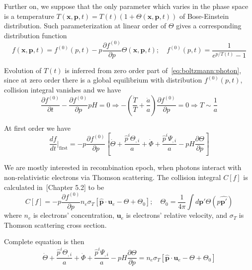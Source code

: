 \documentclass[12pt]{extarticle}
\numberwithin{problem}{section}
\numberwithin{theorem}{section}
\begin{document}
	Further on, we suppose that the only parameter which varies in the phase space is a temperature $T(\mathbf{x}, \mathbf{p}, t) = T(t)(1 + \Theta(\mathbf{x}, \mathbf{p}, t))$ of Bose-Einstein distribution. Such parameterization at linear order of $\Theta$ gives a corresponding distribution function
	\begin{equation}
		f(\mathbf{x}, \mathbf{p}, t) = f^{(0)}(p, t) - p\frac{\partial f^{(0)}}{\partial p}\Theta(\mathbf{x}, \mathbf{p}, t);\quad f^{(0)}(p, t) = \frac{1}{e^{p / T(t)} - 1}
	\end{equation} 

	Evolution of $T(t)$ is inferred from zero order part of~\ref{eq:boltzmann:photon}, since at zero order there is a global equilibrium with distribution $f^{(0)}(p, t)$, collision integral vanishes and we have
	\begin{equation}
		\frac{\partial f^{(0)}}{\partial t} - \frac{\partial f^{(0)}}{\partial p}pH = 0\Rightarrow -\left(\frac{\dot{T}}{T} + \frac{\dot{a}}{a}\right)\frac{\partial f^{(0)}}{\partial p} = 0\Rightarrow T\sim\frac{1}{a}
	\end{equation}

	At first order we have
	\begin{equation}
		\frac{df}{dt}\Big\lvert_{\text{first}} = -p\frac{\partial f^{(0)}}{\partial p}\left[\dot{\Theta} + \frac{\hat{p}^i\Theta_{,i}}{a} + \dot{\Phi} + \frac{\hat{p}^i\Psi_{,i}}{a} - pH\frac{\partial\Theta}{\partial p}\right]
	\end{equation}

	We are mostly interested in recombination epoch, when photons interact with non-relativistic electrons via Thomson scattering. The collision integral $C[f]$ is calculated in~\cite{dodelson:2003}[Chapter 5.2] to be
	\begin{equation}
		C[f] = -p\frac{\partial f^{(0)}}{\partial p}n_e\sigma_T\left[\mathbf{\hat{p}}\cdot\mathbf{u}_e - \Theta + \Theta_0\right];\quad \Theta_0 = \frac{1}{4\pi}\int d\mathbf{\hat{p'}}\Theta(p\mathbf{\hat{p'}})
	\end{equation}
	where $n_e$ is electrons' concentration, $\mathbf{u}_e$ is electrons' relative velocity, and $\sigma_T$ is Thomson scattering cross section.
	
	Complete equation is then
	\begin{equation}
		\dot{\Theta} + \frac{\hat{p}^i\Theta_{,i}}{a} + \dot{\Phi} + \frac{\hat{p}^i\Psi_{,i}}{a} - pH\frac{\partial\Theta}{\partial p} = n_e\sigma_T\left[\mathbf{\hat{p}}\cdot\mathbf{u}_e - \Theta + \Theta_0\right]
	\end{equation}
\end{document}
